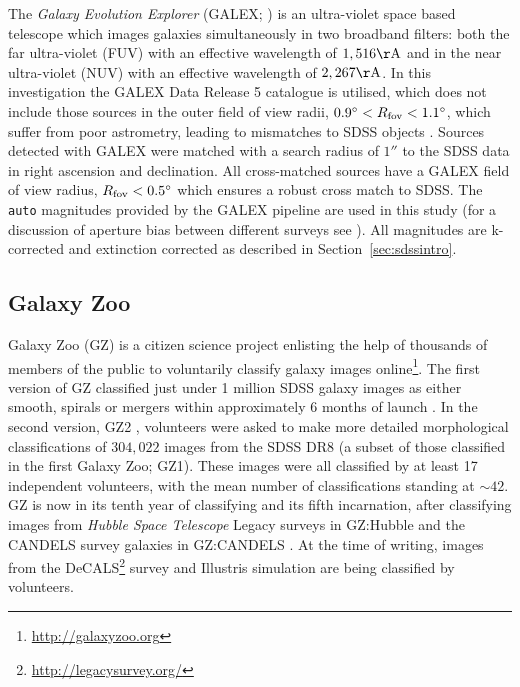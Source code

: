 The \emph{Galaxy Evolution Explorer} (GALEX; \citealt{Martin05}) is an ultra-violet space based telescope which images galaxies simultaneously in two broadband filters: both the far ultra-violet (FUV) with an effective wavelength of $1,516 \rm{\AA}$ and in the near ultra-violet (NUV) with an effective wavelength of $2,267 \rm{\AA}$. {\minor In this investigation the GALEX Data Release 5 catalogue \citep[][accessed via the virtual observatory using the TOPCAT application]{bianchi11} is utilised, which does not include those sources in the outer field of view radii, $0.9^\circ < R_{\rm{fov}} < 1.1^\circ$, which suffer from poor astrometry, leading to mismatches to SDSS objects \citep[see][]{?,?}.} Sources detected with GALEX were matched with a search radius of $1''$ to the SDSS data in right ascension and declination. {\minor All cross-matched sources have a GALEX field of view radius, $R_{\rm{fov}} < 0.5^\circ$ which ensures a robust cross match to SDSS}. The {\tt auto} magnitudes provided by the GALEX pipeline are used in this study (for a discussion of aperture bias between different surveys see \citealt{hill11}). All magnitudes are k-corrected and extinction corrected as described in Section~\ref{sec:sdssintro}.

\subsection{Galaxy Zoo}\label{sec:GZ}

Galaxy Zoo (GZ) is a citizen science project enlisting the help of thousands of members of the public to voluntarily classify galaxy images online\footnote{\url{http://galaxyzoo.org}}. The first version of GZ classified just under 1 million SDSS galaxy images as either smooth, spirals or mergers within approximately 6 months of launch \citep{lintott08, Lintott11}. In the second version, GZ2 \citep{GZ2}, volunteers were asked to make more detailed morphological classifications of $304, 022$ images from the SDSS DR8 (a subset of those classified in the first Galaxy Zoo; GZ1). These images were all classified by at least 17 independent volunteers, with the mean number of classifications standing at $\sim42$. GZ is now in its tenth year of classifying and its fifth incarnation, after classifying images from \emph{Hubble Space Telescope} Legacy surveys in GZ:Hubble \citep{willett16} and the CANDELS survey galaxies in GZ:CANDELS \citep{simmons16}. At the time of writing, images from the DeCALS\footnote{\url{http://legacysurvey.org/}} survey and Illustris simulation \citep{vogelsberger14, genel14} are being classified by volunteers. 

